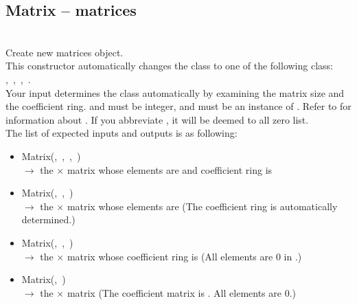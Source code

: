  \subsection{Matrix -- matrices}
 \initialize
  \\
  \spacing
  \quad Create new matrices object.\\
  \spacing
  \quad \negok This constructor automatically changes the class to one of the following class: ,\ ,\ ,\ .\\
  \spacing
  \quad Your input determines the class automatically by examining the matrix size and the coefficient ring.
    and  must be integer, and  must be an instance of .
   Refer to  for information about .
   If you abbreviate , it will be deemed to all zero list.\\
   The list of expected inputs and outputs is as following:
   \begin{itemize}
     \item Matrix(,\ ,\ ,\ )\\
       $\to$ the $\times$ matrix whose elements are  and coefficient ring is 
     \item Matrix(,\ ,\ )\\
       $\to$ the $\times$ matrix whose elements are  (The coefficient ring is automatically determined.)
     \item Matrix(,\ ,\ )\\
       $\to$ the $\times$ matrix whose coefficient ring is  (All elements are $0$ in .)
     \item Matrix(,\ )\\
       $\to$ the $\times$ matrix (The coefficient matrix is . All elements are $0$.)
   \end{itemize}
